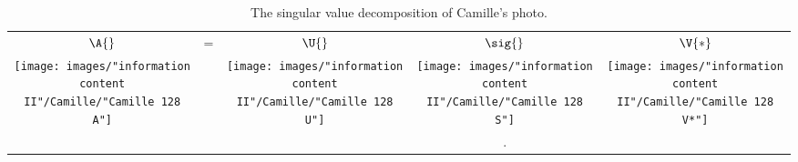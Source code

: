 \begin{table}[htdp]
\caption[The singular value decomposition of Camille's photo]{The singular value decomposition of Camille's photo.}
\begin{center}
\begin{tabular}{ccccc}
%
 $\A{}$ & = & $\U{}$ & $\sig{}$ & $\V{*}$ \\
%
 \texttt{[image: images/"information content II"/Camille/"Camille 128 A"]} &&
 \texttt{[image: images/"information content II"/Camille/"Camille 128 U"]} &
 \texttt{[image: images/"information content II"/Camille/"Camille 128 S"]} &
 \texttt{[image: images/"information content II"/Camille/"Camille 128 V*"]} \\
%
 &&&.\\
%
\end{tabular}
\end{center}
\label{tab:info content II:Camille}
\end{table}%


\endinput